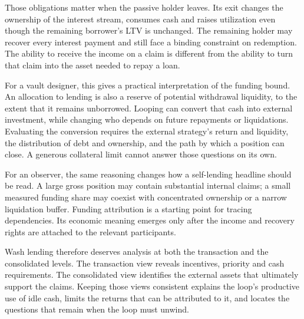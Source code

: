 \documentclass[12pt,oneside]{article}
\begin{document}
Those obligations matter when the passive holder leaves. Its exit
changes the ownership of the interest stream, consumes cash and raises
utilization even though the remaining borrower's LTV is unchanged.
The remaining holder may recover every interest payment and still
face a binding constraint on redemption. The ability to receive the
income on a claim is different from the ability to turn that claim
into the asset needed to repay a loan.

For a vault designer, this gives a practical interpretation of the
funding bound. An allocation to lending is also a reserve of potential
withdrawal liquidity, to the extent that it remains unborrowed.
Looping can convert that cash into external investment, while changing
who depends on future repayments or liquidations. Evaluating the
conversion requires the external strategy's return and liquidity,
the distribution of debt and ownership, and the path by which a
position can close. A generous collateral limit cannot answer those
questions on its own.

For an observer, the same reasoning changes how a self-lending headline
should be read. A large gross position may contain substantial internal
claims; a small measured funding share may coexist with concentrated
ownership or a narrow liquidation buffer. Funding attribution is a
starting point for tracing dependencies. Its economic meaning emerges
only after the income and recovery rights are attached to the relevant
participants.

Wash lending therefore deserves analysis at both the transaction and
the consolidated levels. The transaction view reveals incentives,
priority and cash requirements. The consolidated view identifies the
external assets that ultimately support the claims. Keeping those
views consistent explains the loop's productive use of idle cash,
limits the returns that can be attributed to it, and locates the
questions that remain when the loop must unwind.

\clearpage
\appendix
\end{document}
